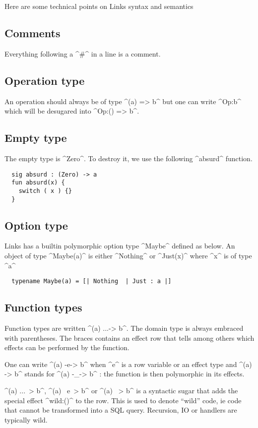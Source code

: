\documentclass[nonacm=true, language=french, language=english]{acmart}
\begin{document}
Here are some technical points on Links syntax and semantics

\subsection{Comments}
\label{sec:comments}
Everything following a ^#^ in a line is a comment.

\subsection{Operation type}
\label{sec:operation-type}
An operation should always be of type ^(a) => b^ but one can write ^Op:b^ which will be desugared into ^Op:() => b^.

\subsection{Empty type}
\label{sec:tech:zero}
The empty type is ^Zero^. To destroy it, we use the following ^absurd^ function.
\begin{lstlisting}
  sig absurd : (Zero) -> a
  fun absurd(x) {
    switch ( x ) {}
  }
\end{lstlisting}

\subsection{Option type}
\label{sec:tech:maybe}
Links has a builtin polymorphic option type ^Maybe^ defined as below. An object of type ^Maybe(a)^ is either ^Nothing^ or ^Just(x)^ where ^x^ is of type ^a^
\begin{lstlisting}
  typename Maybe(a) = [| Nothing  | Just : a |]
\end{lstlisting}

\subsection{Function types}
Function types are written ^(a) {...}-> b^. The domain type is always embraced with parentheses. The braces contains an effect row that tells among others which effects can be performed by the function.

One can write ^(a) -e-> b^ when ^e^ is a row variable or an effect type and ^(a) -> b^ stands for ^(a) -_-> b^ : the function is then polymorphic in its effects.

^(a) {...}~> b^, ^(a) ~e~> b^ or ^(a) ~> b^ is a syntactic sugar that adds the special effect ^wild:()^ to the row. This is used to denote ``wild'' code, ie code that cannot be transformed into a SQL query. Recursion, IO or handlers are typically wild. \cite{}
\end{document}
